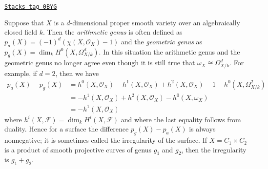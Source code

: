\begin{remark}
\label{curves-remark-genus-higher-dimension}
\href{https://stacks.math.columbia.edu/tag/0BYG}{\texttt{Stacks tag 0BYG}}

Suppose that $X$ is a $d$-dimensional proper smooth variety over
an algebraically closed field $k$.
Then the {\it arithmetic genus} is often defined as
$p_a(X) = (-1)^d(\chi(X, \mathcal{O}_X) - 1)$ and the {\it geometric genus}
as $p_g(X) = \dim_k H^0(X, \Omega^d_{X/k})$. In this situation
the arithmetic genus and the geometric genus no longer agree
even though it is still true that $\omega_X \cong \Omega_{X/k}^d$.
For example, if $d = 2$, then we have
\begin{align*}
p_a(X) - p_g(X) & =
h^0(X, \mathcal{O}_X) - h^1(X, \mathcal{O}_X) + h^2(X, \mathcal{O}_X) - 1
- h^0(X, \Omega^2_{X/k}) \\
& =
- h^1(X, \mathcal{O}_X) + h^2(X, \mathcal{O}_X) - h^0(X, \omega_X) \\
& =
- h^1(X, \mathcal{O}_X)
\end{align*}
where $h^i(X, \mathcal{F}) = \dim_k H^i(X, \mathcal{F})$ and
where the last equality follows from duality.
Hence for a surface the difference $p_g(X) - p_a(X)$ is always
nonnegative; it is sometimes called the irregularity of the surface.
If $X = C_1 \times C_2$ is a product of smooth projective curves of
genus $g_1$ and $g_2$, then the irregularity is $g_1 + g_2$.
\end{remark}

